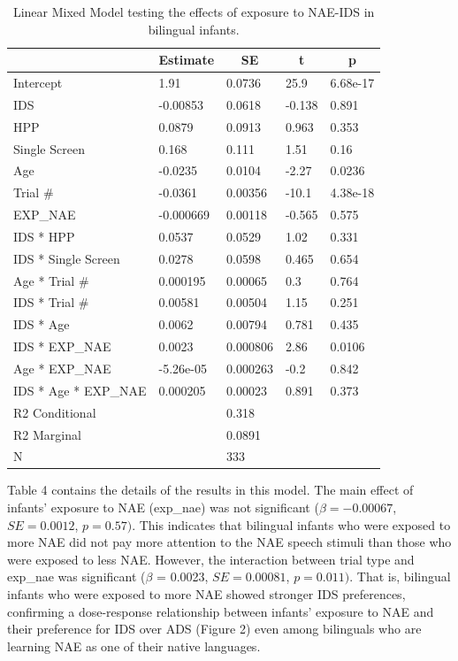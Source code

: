 \documentclass[
  english,
  ,man,floatsintext]{apa6}
\begin{document}
\begin{table}[tbp]
\begin{center}
\begin{threeparttable}
\caption{\label{tab:unnamed-chunk-12}Linear Mixed Model testing the effects of exposure to NAE-IDS in bilingual infants.}
\begin{tabular}{lllll}
\toprule
 & \multicolumn{1}{c}{Estimate} & \multicolumn{1}{c}{SE} & \multicolumn{1}{c}{t} & \multicolumn{1}{c}{p}\\
\midrule
Intercept & 1.91 & 0.0736 & 25.9 & 6.68e-17\\
IDS & -0.00853 & 0.0618 & -0.138 & 0.891\\
HPP & 0.0879 & 0.0913 & 0.963 & 0.353\\
Single Screen & 0.168 & 0.111 & 1.51 & 0.16\\
Age & -0.0235 & 0.0104 & -2.27 & 0.0236\\
Trial \# & -0.0361 & 0.00356 & -10.1 & 4.38e-18\\
EXP\_NAE & -0.000669 & 0.00118 & -0.565 & 0.575\\
IDS * HPP & 0.0537 & 0.0529 & 1.02 & 0.331\\
IDS * Single Screen & 0.0278 & 0.0598 & 0.465 & 0.654\\
Age * Trial \# & 0.000195 & 0.00065 & 0.3 & 0.764\\
IDS * Trial \# & 0.00581 & 0.00504 & 1.15 & 0.251\\
IDS * Age & 0.0062 & 0.00794 & 0.781 & 0.435\\
IDS * EXP\_NAE & 0.0023 & 0.000806 & 2.86 & 0.0106\\
Age * EXP\_NAE & -5.26e-05 & 0.000263 & -0.2 & 0.842\\
IDS * Age * EXP\_NAE & 0.000205 & 0.00023 & 0.891 & 0.373\\ \midrule
R2 Conditional &  & 0.318 &  & \\
R2 Marginal &  & 0.0891 &  & \\ \midrule
N &  & 333 &  & \\
\bottomrule
\end{tabular}
\end{threeparttable}
\end{center}
\end{table}

Table 4 contains the details of the results in this model. The main effect of infants' exposure to NAE (exp\_nae) was not significant (\(\beta = -0.00067\), \(SE = 0.0012\), \(p = 0.57)\). This indicates that bilingual infants who were exposed to more NAE did not pay more attention to the NAE speech stimuli than those who were exposed to less NAE. However, the interaction between trial type and exp\_nae was significant (\(\beta\) = 0.0023, \(SE = 0.00081\), \(p = 0.011)\). That is, bilingual infants who were exposed to more NAE showed stronger IDS preferences, confirming a dose-response relationship between infants' exposure to NAE and their preference for IDS over ADS (Figure 2) even among bilinguals who are learning NAE as one of their native languages.
\end{document}
